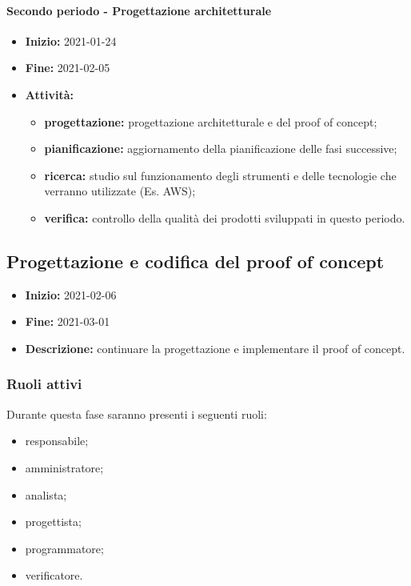 \paragraph[Secondo periodo]{Secondo periodo - \textnormal{Progettazione architetturale}}
\begin{itemize}
    \item [] \textbf{Inizio:} 2021-01-24
    \item [] \textbf{Fine:} 2021-02-05
    \item [] \textbf{Attività:}
          \begin{itemize}
              \item \textbf{progettazione:} progettazione architetturale e del proof of concept;
              \item \textbf{pianificazione:} aggiornamento della pianificazione delle fasi successive;
              \item \textbf{ricerca:} studio sul funzionamento degli strumenti e delle tecnologie che verranno utilizzate (Es. AWS);
              \item \textbf{verifica:} controllo della qualità dei prodotti sviluppati in questo periodo.
          \end{itemize}
\end{itemize}


\subsection{Progettazione e codifica del proof of concept} \label{_pianificazioneCodificaPoC}
\begin{itemize}
    \item []\textbf{Inizio:} 2021-02-06
    \item []\textbf{Fine:} 2021-03-01
    \item []\textbf{Descrizione:} continuare la progettazione e implementare il proof of concept.
\end{itemize}

\subsubsection{Ruoli attivi}
Durante questa fase saranno presenti i seguenti ruoli:
\begin{itemize}
    \item responsabile;
    \item amministratore;
    \item analista;
    \item progettista;
    \item programmatore;
    \item verificatore.
\end{itemize}

